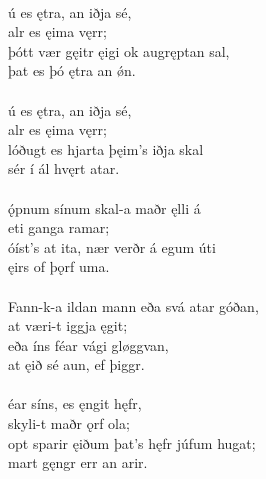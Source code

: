  \\

\bva {}ú es ętra, \hld an iðja sé, \\%
\ind {}alr es ęima vęrr; \\%
þótt vær gęitr ęigi \hld ok augręptan sal, \\%
\ind þat es þó ętra an ǿn.\\%

 \\

\bva {}ú es ętra, \hld an iðja sé, \\%
\ind {}alr es ęima vęrr; \\%
lóðugt es hjarta \hld þęim's iðja skal \\%
\ind sér í ál hvęrt atar.\\%

 \\

\bva {}ǫ́pnum sínum \hld skal-a maðr ęlli á \\%
\ind {}eti ganga ramar; \\%
óíst's at ita, \hld nær verðr á egum úti \\%
\ind {}ęirs of þǫrf uma.\\%

 \\

\bva Fann-k-a ildan mann \hld eða svá atar góðan, \\%
\ind at væri-t iggja ęgit; \\%
eða íns féar \hld {}vági gløggvan, \\%
\ind at ęið sé aun, ef þiggr.\\%

 \\

\bva {}éar síns, \hld es ęngit hęfr, \\%
\ind skyli-t maðr ǫrf ola; \\%
opt sparir ęiðum \hld þat's hęfr júfum hugat; \\%
\ind mart gęngr err an arir.\\%

 \\

